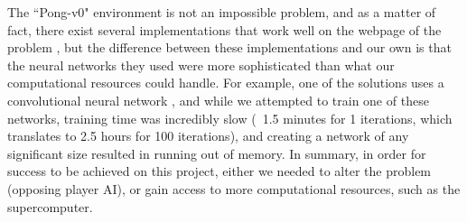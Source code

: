 \documentclass[12pt]{article}
\theoremstyle{plain}
\theoremstyle{definition}
\theoremstyle{remark}
\theoremstyle{plain}
\begin{document}
\par
The ``Pong-v0" environment is not an impossible problem, and as a matter of fact, there exist several implementations that work well on the webpage of the problem \cite{pong}, but the difference between these implementations and our own is that the neural networks they used were more sophisticated than what our computational resources could handle.  For example, one of the solutions uses a convolutional neural network \cite{eval,conv}, and while we attempted to train one of these networks, training time was incredibly slow (~1.5 minutes for 1 iterations, which translates to 2.5 hours for 100 iterations), and creating a network of any significant size resulted in running out of memory.  In summary, in order for success to be achieved on this project, either we needed to alter the problem (opposing player AI), or gain access to more computational resources, such as the supercomputer.
\end{document}
